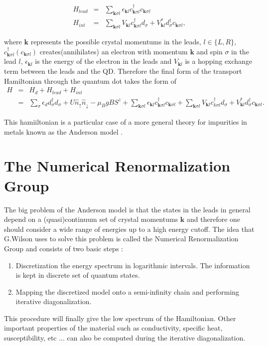 \begin{eqnarray*}
H_{lead} & = & \sum_{\mathbf{k}\sigma l}\epsilon_{\mathbf{k}l}c_{\mathbf{k}\sigma l}^{\dagger}c_{\mathbf{k}\sigma l}\\
H_{int} & = & \sum_{\mathbf{k}\sigma l}V_{\mathbf{k}l}c_{\mathbf{k}\sigma l}^{\dagger}d_{\sigma}+V_{\mathbf{k}l}^{*}d_{\sigma}^{\dagger}c_{\mathbf{k}\sigma l},
\end{eqnarray*}


where $\mathbf{k}$ represents the possible crystal momentums in the
leads, $l\in\{L,R\}$, $c_{\mathbf{k}\sigma l}^{\dagger}(c_{\mathbf{k}\sigma l})$
creates(annihilates) an electron with momentum $\mathbf{k}$ and spin
$\sigma$ in the lead $l$, $\epsilon_{\mathbf{k}l}$ is the energy
of the electron in the leads and $V_{\mathbf{k}l}$ is a hopping exchange
term between the leads and the QD. Therefore the final form of the
transport Hamiltonian through the quantum dot takes the form of 
\begin{eqnarray}
H & = & H_{d}+H_{lead}+H_{int}\nonumber \\
 & = & \sum_{\sigma}\epsilon_{d}d_{\sigma}^{\dagger}d_{\sigma}+U\hat{n}_{\uparrow}\hat{n}_{\downarrow}-\mu_{B}gBS^{z}+\sum_{\mathbf{k}\sigma l}\epsilon_{\mathbf{k}l}c_{\mathbf{k}\sigma l}^{\dagger}c_{\mathbf{k}\sigma l}+\sum_{\mathbf{k}\sigma l}V_{\mathbf{k}l}c_{k\sigma l}^{\dagger}d_{\sigma}+V_{\mathbf{k}l}^{*}d_{\sigma}^{\dagger}c_{\mathbf{k}\sigma l}.\label{eq:Anderson}
\end{eqnarray}


This hamiiltonian is a particular case of a more general theory for
impurities in metals known as the Anderson model \citep{anderson_localized_1961}.


\section{The Numerical Renormalization Group\label{sec:The-Numerical-Renormaliztion} }

The big problem of the Anderson model is that the states in the leads
in general depend on a (quasi)continuum set of crystal momentums $\mathbf{k}$
and therefore one should consider a wide range of energies up to a
high energy cutoff. The idea that G.Wilson uses to solve this problem
is called the Numerical Renormalization Group \citep{bulla_numerical_2008,wilson_renormalization_1975,krishna-murthy_renormalization-group_1980}
and consists of two basic steps :
\begin{enumerate}
\item Discretization the energy spectrum in logarithmic intervals. The information
is kept in discrete set of quantum states. 
\item Mapping the discretized model onto a semi-infinity chain and performing
iterative diagonalization. 
\end{enumerate}
This procedure will finally give the low spectrum of the Hamiltonian.
Other important properties of the material such as conductivity, specific
heat, susceptibility, etc ... can also be computed during the iterative
diagonalization. \\

